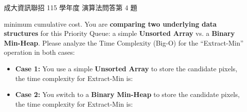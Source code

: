\begin{pastexam}[label={px:ncku-115-prog-17}]{成大資訊聯招 115 學年度 演算法問答第 4 題}
\begin{enumerate}[label=(\arabic*)]
minimum cumulative cost. You are \textbf{comparing two underlying data structures} for this Priority
Queue: a simple \textbf{Unsorted Array} vs. a \textbf{Binary Min-Heap}. Please analyze the Time
Complexity (Big-O) for the ``Extract-Min'' operation in both cases:
\begin{itemize}
\item \textbf{Case 1:} You use a simple \textbf{Unsorted Array} to store the candidate pixels, the time
complexity for Extract-Min is: \underline{\hspace{4.5cm}}
\item \textbf{Case 2:} You switch to a \textbf{Binary Min-Heap} to store the candidate pixels, the time
complexity for Extract-Min is: \underline{\hspace{4.5cm}}
\end{itemize}
\end{enumerate}
\end{pastexam}

